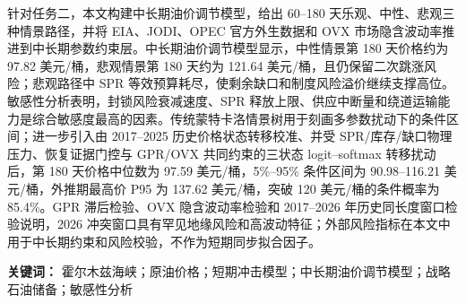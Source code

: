 针对任务二，本文构建中长期油价调节模型，给出 60--180 天乐观、中性、悲观三种情景路径，并将 EIA、JODI、OPEC 官方外生数据和 OVX 市场隐含波动率推进到中长期参数约束层。中长期油价调节模型显示，中性情景第 180 天价格约为 97.82 美元/桶，悲观情景第 180 天约为 121.64 美元/桶，且仍保留二次跳涨风险；悲观路径中 SPR 等效预算耗尽，使剩余缺口和制度风险溢价继续支撑高位。敏感性分析表明，封锁风险衰减速度、SPR 释放上限、供应中断量和绕道运输能力是综合敏感度最高的因素。传统蒙特卡洛情景树用于刻画多参数扰动下的条件区间；进一步引入由 2017--2025 历史价格状态转移校准、并受 SPR/库存/缺口物理压力、恢复证据门控与 GPR/OVX 共同约束的三状态 logit--softmax 转移扰动后，第 180 天价格中位数为 97.59 美元/桶，5\%--95\% 条件区间为 90.98--116.21 美元/桶，外推期最高价 P95 为 137.62 美元/桶，突破 120 美元/桶的条件概率为 85.4\%。GPR 滞后检验、OVX 隐含波动率检验和 2017--2026 年历史同长度窗口检验说明，2026 冲突窗口具有罕见地缘风险和高波动特征；外部风险指标在本文中用于中长期约束和风险校验，不作为短期同步拟合因子。

\vspace{0.35em}
\noindent\textbf{\color{OilBlue}关键词：} 霍尔木兹海峡；原油价格；短期冲击模型；中长期油价调节模型；战略石油储备；敏感性分析
\normalfont\normalsize
